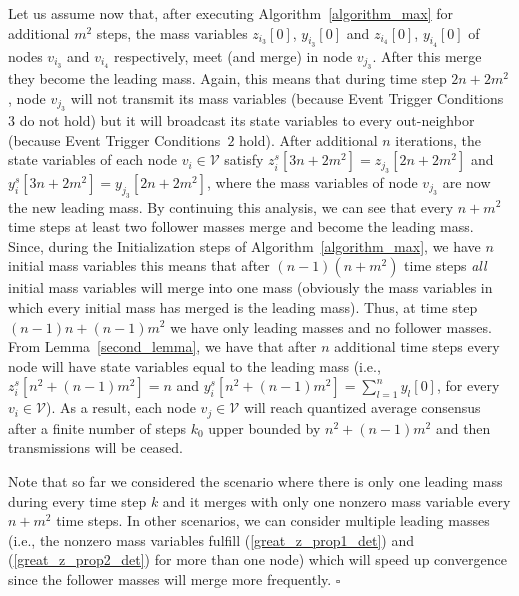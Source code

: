 \documentclass[twocolumn]{autart}    %
\begin{document}
\begin{pf}
Let us assume now that, after executing Algorithm~\ref{algorithm_max} for additional $m^2$ steps, the mass variables $z_{i_3}[0]$, $y_{i_3}[0]$ and $z_{i_4}[0]$, $y_{i_4}[0]$ of nodes $v_{i_3}$ and $v_{i_4}$ respectively, meet (and merge) in node $v_{j_3}$.
After this merge they become the leading mass. 
Again, this means that during time step $2n + 2m^2$, node $v_{j_3}$ will not transmit its mass variables (because Event Trigger Conditions~$3$ do not hold) but it will broadcast its state variables to every out-neighbor (because Event Trigger Conditions~$2$ hold). 
After additional $n$ iterations, the state variables of each node $v_i \in \mathcal{V}$ satisfy $z^s_i[3n + 2m^2] = z_{j_3}[2n + 2m^2]$ and $y^s_i[3n + 2m^2] = y_{j_3}[2n + 2m^2]$, where the mass variables of node $v_{j_3}$ are now the new leading mass. 
By continuing this analysis, we can see that every $n + m^2$ time steps at least two follower masses merge and become the leading mass. 
Since, during the Initialization steps of Algorithm~\ref{algorithm_max}, we have $n$ initial mass variables this means that after $(n - 1)(n + m^2)$ time steps {\it all} initial mass variables will merge into one mass (obviously the mass variables in which every initial mass has merged is the leading mass). 
Thus, at time step $(n-1)n + (n-1)m^2$ we have only leading masses and no follower masses. 
From Lemma~\ref{second_lemma}, we have that after $n$ additional time steps every node will have state variables equal to the leading mass (i.e., $z^s_i[n^2 + (n-1)m^2] = n$ and $y^s_i[n^2 + (n-1)m^2] = \sum_{l=1}^{n}{y_l[0]}$, for every $v_i \in \mathcal{V}$).  
As a result, each node $v_j \in \mathcal{V}$ will reach quantized average consensus after a finite number of steps $k_0$ upper bounded by $n^2 + (n-1)m^2$ and then transmissions will be ceased. 


Note that so far we considered the scenario where there is only one leading mass during every time step $k$ and it merges with only one nonzero mass variable every $n + m^2$ time steps. 
In other scenarios, we can consider multiple leading masses (i.e., the nonzero mass variables fulfill (\ref{great_z_prop1_det}) and (\ref{great_z_prop2_det}) for more than one node) which will speed up convergence since the follower masses will merge more frequently. \hspace*{\fill} $\square$
\end{pf}
\end{document}
